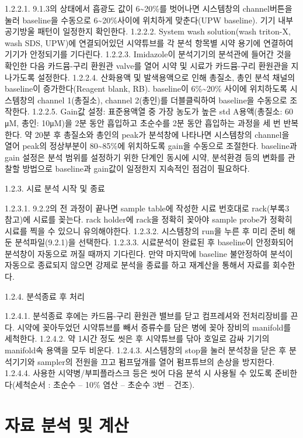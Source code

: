 \documentclass[
]{book}
\begin{document}
1.2.2.1. 9.1.3의 상태에서 흡광도 값이 6\textasciitilde20\%를 벗어나면 시스템창의 channel버튼을 눌러 baseline을 수동으로 6\textasciitilde20\%사이에 위치하게 맞춘다(UPW baseline). 기기 내부 공기방울 패턴이 일정한지 확인한다.
1.2.2.2. System wash solution(wash triton-X, wash SDS, UPW)에 연결되어있던 시약튜브를 각 분석 항목별 시약 용기에 연결하여 기기가 안정되기를 기다린다.
1.2.2.3. Imidazole이 분석기기의 분석관에 들어간 것을 확인한 다음 카드뮴-구리 환원관 valve를 열어 시약 및 시료가 카드뮴-구리 환원관을 지나가도록 설정한다.
1.2.2.4. 산화용액 및 발색용액으로 인해 총질소, 총인 분석 채널의 baseline이 증가한다(Reagent blank, RB). baseline이 6\%\textasciitilde20\% 사이에 위치하도록 시스템창의 channel 1(총질소), channel 2(총인)를 더블클릭하여 baseline을 수동으로 조작한다.
1.2.2.5. Gain값 설정: 표준용액열 중 가장 농도가 높은 std A용액(총질소: 60 μM, 총인: 10μM)을 2분 동안 흡입하고 초순수를 2분 동안 흡입하는 과정을 세 번 반복한다. 약 20분 후 총질소와 총인의 peak가 분석창에 나타나면 시스템창의 channel을 열어 peak의 정상부분이 80\textasciitilde85\%에 위치하도록 gain을 수동으로 조절한다. baseline과 gain 설정은 분석 범위를 설정하기 위한 단계인 동시에 시약, 분석환경 등의 변화를 관찰할 방법으로 baseline과 gain값이 일정한지 지속적인 점검이 필요하다.

1.2.3. 시료 분석 시작 및 종료

1.2.3.1. 9.2.2의 전 과정이 끝나면 sample table에 작성한 시료 번호대로 rack(부록3 참고)에 시료를 꽂는다. rack holder에 rack을 정확히 꽂아야 sample probe가 정확히 시료를 찍을 수 있으니 유의해야한다.
1.2.3.2. 시스템창의 run을 누른 후 미리 준비 해둔 분석파일(9.2.1)을 선택한다.
1.2.3.3. 시료분석이 완료된 후 baseline이 안정화되어 분석창이 자동으로 꺼질 때까지 기다린다. 만약 마지막에 baseline 불안정하여 분석이 자동으로 종료되지 않으면 강제로 분석을 종료를 하고 재계산을 통해서 자료를 회수한다.

1.2.4. 분석종료 후 처리

1.2.4.1. 분석종료 후에는 카드뮴-구리 환원관 밸브를 닫고 컴프레셔와 전처리장비를 끈다. 시약에 꽂아두었던 시약튜브를 빼서 증류수를 담은 병에 꽂아 장비의 manifold를 세척한다.
1.2.4.2. 약 1시간 정도 씻은 후 시약튜브를 닦아 호일로 감싸 기기의 manifold속 용액을 모두 비운다.
1.2.4.3. 시스템창의 stop을 눌러 분석창을 닫은 후 분석기기와 sampler의 전원을 끄고 펌프덮개를 열어 펌프튜브의 손상을 방지한다.
1.2.4.4. 사용한 시약병/부피플라스크 등은 씻어 다음 분석 시 사용될 수 있도록 준비한다(세척순서 : 초순수 -- 10\% 염산 -- 초순수 3번 -- 건조).

\hypertarget{uxc790uxb8cc-uxbd84uxc11d-uxbc0f-uxacc4uxc0b0-1}{%
\section{자료 분석 및 계산}\label{uxc790uxb8cc-uxbd84uxc11d-uxbc0f-uxacc4uxc0b0-1}}
\end{document}
